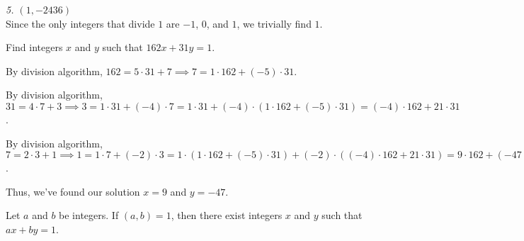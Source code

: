 \documentclass[../main.tex]{subfiles}
\begin{document}
\hspace*{5mm} \emph{5. $(1, -2436)$} \\
\hspace*{15mm} Since the only integers that divide $1$ are $-1$, $0$, and $1$, we trivially find $1$. \\



\begin{ex} \label{1.37}
  Find integers $x$ and $y$ such that $162x + 31y = 1$.
\end{ex}

By division algorithm, $162 = 5 \cdot 31 + 7 \implies 7 = 1 \cdot 162 + (-5) \cdot 31$.

By division algorithm, $31 = 4 \cdot 7 + 3 \implies 3 = 1 \cdot 31 + (-4) \cdot 7 = 1 \cdot 31 + (-4) \cdot (1 \cdot 162 + (-5) \cdot 31) = (-4) \cdot 162 + 21 \cdot 31$.

By division algorithm, $7 = 2 \cdot 3 + 1 \implies 1 = 1 \cdot 7 + (-2) \cdot 3 = 1 \cdot (1 \cdot 162 + (-5) \cdot 31) + (-2) \cdot ((-4) \cdot 162 + 21 \cdot 31) = 9 \cdot 162 + (-47) \cdot 31$.

Thus, we've found our solution $x = 9$ and $y = -47$.



\pagebreak



\begin{thm} \label{1.38}
  Let $a$ and $b$ be integers. If $(a, b) = 1$, then there exist integers $x$ and $y$ such that $ax + by = 1$.
\end{thm}
\end{document}
